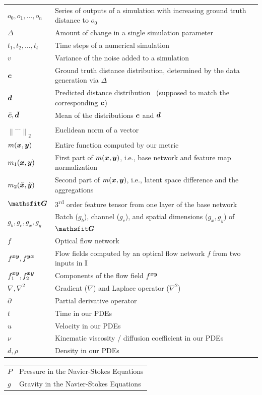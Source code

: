 \bgroup
\def\arraystretch{1.5}
\begin{tabular}{p{2cm}p{5.4cm}}
$\displaystyle o_0, o_1, \dotsc, o_n$ & Series of outputs of a simulation with increasing ground truth distance to $o_0$\\
$\displaystyle \Delta$ & Amount of change in a single simulation parameter\\
$\displaystyle t_1, t_2, \dotsc, t_t$ & Time steps of a numerical simulation\\
$\displaystyle v$ & Variance of the noise added to a simulation\\
$\displaystyle {\bm{c}}$ & Ground truth distance distribution, determined by the data generation via $\Delta$ \\
$\displaystyle {\bm{d}}$ & Predicted distance distribution~ (supposed to match the corresponding ${\bm{c}}$)\\
$\displaystyle \bar{{\bm{c}}}, \bar{{\bm{d}}}$ & Mean of the distributions ${\bm{c}}$ and ${\bm{d}}$\\
$\displaystyle \left\| \dotsc \right\|_2$ & Euclidean norm of a vector\\
$\displaystyle m({\bm{x}},{\bm{y}})$ & Entire function computed by our metric\\
$\displaystyle m_1({\bm{x}},{\bm{y}})$ & First part of $m({\bm{x}},{\bm{y}})$, i.e., base network and feature map normalization\\
$\displaystyle m_2(\tilde{{\bm{x}}},\tilde{{\bm{y}}})$ & Second part of $m({\bm{x}},{\bm{y}})$, i.e., latent space difference and the aggregations \\
$\displaystyle \tG$ & 3\textsuperscript{rd} order feature tensor from one layer of the base network \\
$\displaystyle g_b,g_c,g_x,g_y$ & Batch ($g_b$), channel ($g_c$), and spatial dimensions ($g_x,g_y$) of $\tG$\\
$\displaystyle f$ & Optical flow network\\
$\displaystyle f^{{\bm{x}}{\bm{y}}}, f^{{\bm{y}}{\bm{x}}}$ & Flow fields computed by an optical flow network $f$ from two inputs in ${\mathbb{I}}$\\
$\displaystyle f^{{\bm{x}}{\bm{y}}}_1, f^{{\bm{x}}{\bm{y}}}_2$ & Components of the flow field $f^{{\bm{x}}{\bm{y}}}$\\
$\displaystyle \nabla, \nabla^2$ & Gradient ($\nabla$) and Laplace operator ($\nabla^2$)\\
$\displaystyle \partial$ & Partial derivative operator\\
$\displaystyle t$ & Time in our PDEs\\
$\displaystyle u$ & Velocity in our PDEs\\
$\displaystyle \nu$ & Kinematic viscosity / diffusion coefficient in our PDEs\\
$\displaystyle d, \rho$ & Density in our PDEs\\ 
\end{tabular}
\egroup

\bgroup
\def\arraystretch{1.5}
\begin{tabular}{p{2cm}p{5.4cm}}
$\displaystyle P$ & Pressure in the Navier-Stokes Equations\\
$\displaystyle g$ & Gravity in the Navier-Stokes Equations\\
\end{tabular}
\egroup
